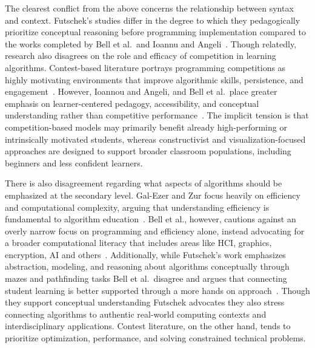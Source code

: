 The clearest conflict from the above concerns the relationship between syntax and context.
Futschek's studies differ in the degree to which they pedagogically prioritize conceptual reasoning before programming implementation compared to the
  works completed by Bell et al.\
and Ioannu and Angeli~\cite{futschek2006algorithmic,bell2014presenting,ioan2013}.
Though relatedly, research also disagrees on the role and efficacy of competition in learning algorithms.
Contest-based literature portrays programming competitions as highly motivating environments that improve algorithmic skills, persistence, and
  engagement~\cite{combefis2014programming,cuba2014learning}.
However, Ioannou and Angeli, and Bell et al.\
place greater emphasis on learner-centered pedagogy, accessibility, and conceptual understanding rather than competitive performance~\cite{bell2014presenting,ioan2013}.
The implicit tension is that competition-based models may primarily benefit already high-performing or intrinsically motivated students, whereas
  constructivist and visualization-focused approaches are designed to support broader classroom populations, including beginners and less confident
  learners.

There is also disagreement regarding what aspects of algorithms should be emphasized at the secondary level.
Gal-Ezer and Zur focus heavily on efficiency and computational complexity, arguing that understanding efficiency is fundamental to algorithm
  education~\cite{gal2004efficiency}.
Bell et al., however, cautions against an overly narrow focus on programming and efficiency alone, instead advocating for a broader computational
  literacy that includes areas like HCI, graphics, encryption, AI and others~\cite{bell2014presenting}.
Additionally, while Futschek's work emphasizes abstraction, modeling, and reasoning about algorithms conceptually through mazes and pathfinding tasks
  Bell et al.\
disagree and argues that connecting student learning is better supported through a more hands on approach~\cite{futschek2006algorithmic,bell2014presenting}.
Though they support conceptual understanding Futschek advocates they also stress connecting algorithms to authentic real-world computing contexts and
  interdisciplinary applications.
Contest literature, on the other hand, tends to prioritize optimization, performance, and solving constrained technical problems.
